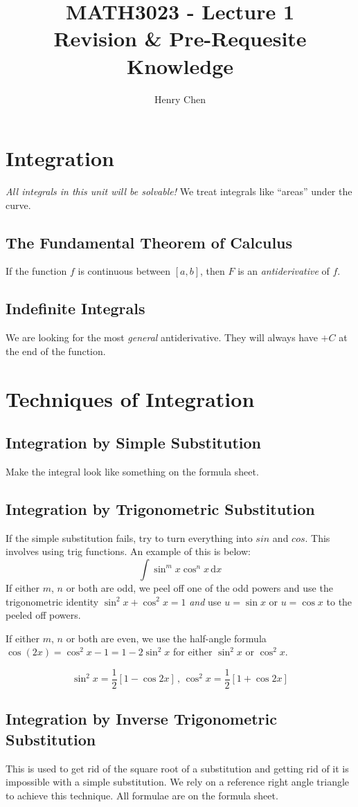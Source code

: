 \documentclass[a4paper, 11pt]{article}
\title{
    \large \textbf{MATH3023 - Lecture 1} \\
    Revision \& Pre-Requesite Knowledge
}
\author{Henry Chen}
\begin{document}
\maketitle
\tableofcontents

\section{Integration}
\emph{All integrals in this unit will be solvable!}
We treat integrals like ``areas'' under the curve.
\subsection{The Fundamental Theorem of Calculus}
If the function $f$ is continuous between $[a,b]$, then $F$ is an \emph{antiderivative} of $f$.
\subsection{Indefinite Integrals}
We are looking for the most \emph{general} antiderivative. They will always have $+C$ at the end of the function. 

\section{Techniques of Integration}
\subsection{Integration by Simple Substitution}
Make the integral look like something on the formula sheet. 
\subsection{Integration by Trigonometric Substitution}
If the simple substitution fails, try to turn everything into $sin$ and $cos$. This involves using trig functions. An example of this is below:
\[
    \int{\sin^{m}{x}\cos^{n}{x}} \,\mathrm{d}x
\]
If either $m$, $n$ or both are odd, we peel off one of the odd powers and use the trigonometric identity $\sin^{2}{x} + \cos^2{x} = 1$ \emph{and} use $u=\sin{x}$ or $u=\cos{x}$ to the peeled off powers.

If either $m$, $n$ or both are even, we use the half-angle formula $\cos(2x) = \cos^{2}{x} - 1 = 1 - 2\sin^{2}{x} $ for either $\sin^{2}{x}$ or $\cos^{2}{x}$.

\[
    \sin^{2}{x} = \frac{1}{2}[1-\cos{2x}] \, , \, \cos^{2}{x} = \frac{1}{2}[1+\cos{2x}]
\]
\subsection{Integration by Inverse Trigonometric Substitution}
This is used to get rid of the square root of a substitution and getting rid of it is impossible with a simple substitution. We rely on a reference right angle triangle to achieve this technique. All formulae are on the formula sheet.
\end{document}

